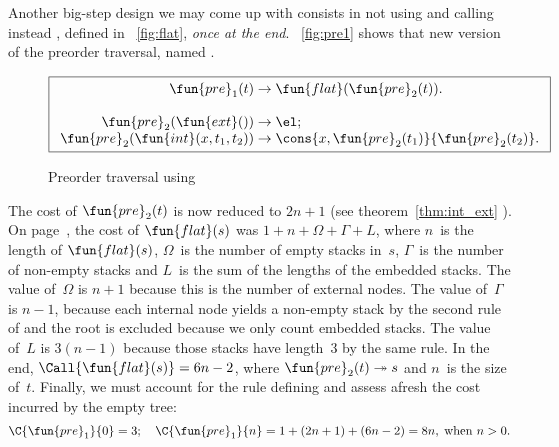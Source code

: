 Another big\hyp{}step design we may come
up with consists in not using  and
calling instead
, defined
in \fig~\vref{fig:flat}, \emph{once at the end}. \Fig~\vref{fig:pre1}
shows that new version of the preorder traversal, named
.
\begin{figure}
\begin{equation*}
\boxed{
\begin{array}{r@{\;}c@{\;}l}
\fun{pre}_1(t) & \rightarrow & \fun{flat}(\fun{pre}_2(t)).\\
\\
\fun{pre}_2(\fun{ext}()) & \rightarrow & \el;\\
\fun{pre}_2(\fun{int}(x,t_1,t_2)) & \rightarrow &
  \cons{x,\fun{pre}_2(t_1)}{\fun{pre}_2(t_2)}.
\end{array}}
\end{equation*}
\caption{Preorder traversal using }
\label{fig:pre1}
\end{figure}
The cost of \(\fun{pre}_2(t)\) is now
reduced to \(2n+1\) (see theorem~\ref{thm:int_ext}
). On page~\pageref{cost:flat}, the cost of
\(\fun{flat}(s)\) was \(1 + n + \Omega +
\Gamma + L\), where \(n\)~is the length of
\(\fun{flat}(s)\), \(\Omega\)~is the number
of empty stacks in~\(s\), \(\Gamma\)~is the number of non\hyp{}empty
stacks and \(L\)~is the sum of the lengths of the embedded stacks. The
value of~\(\Omega\) is \(n+1\) because this is the number of external
nodes. The value of~\(\Gamma\) is \(n-1\), because each internal node
yields a non\hyp{}empty stack by the second rule of
 and the root is
excluded because we only count embedded stacks. The value of~\(L\) is
\(3(n-1)\) because those stacks have length~\(3\) by the same rule. In
the end, \(\Call{\fun{flat}(s)} = 6n - 2\), where \(\fun{pre}_2(t)
\twoheadrightarrow s\) and \(n\)~is the size of~\(t\). Finally, we
must account for the rule defining
 and assess afresh the
cost incurred by the empty tree:
\begin{equation*}
\C{\fun{pre}_1}{0} = 3;\index{pre1@$\C{\fun{pre}_1}{n}$}
\quad
\C{\fun{pre}_1}{n} = 1 + (2n+1) + (6n - 2) = 8n,\;
\text{when \(n > 0\).}
\end{equation*}

